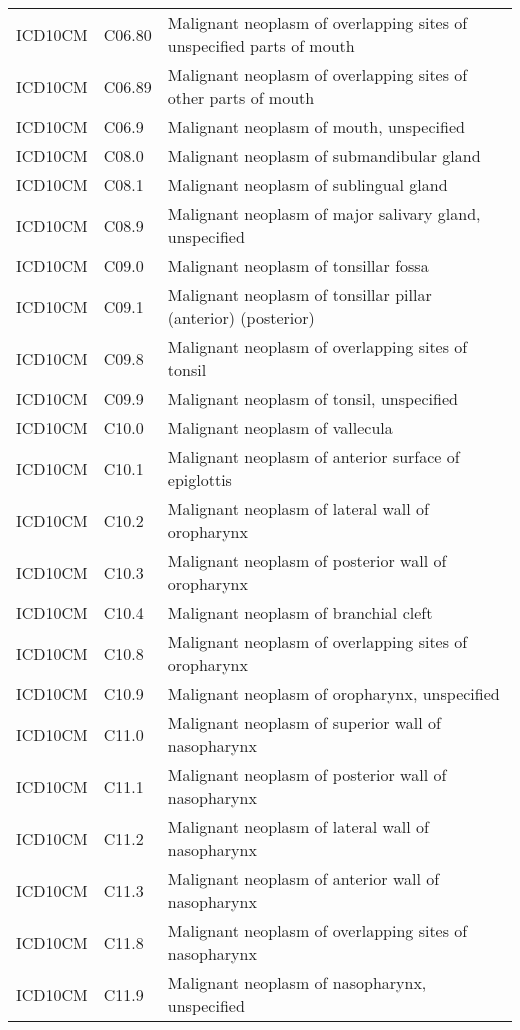 \begin{longtable}{p{}p{}p{}}
  ICD10CM & C06.80 & Malignant neoplasm of overlapping sites of unspecified parts of mouth \\ 
  ICD10CM & C06.89 & Malignant neoplasm of overlapping sites of other parts of mouth \\ 
  ICD10CM & C06.9 & Malignant neoplasm of mouth, unspecified \\ 
  ICD10CM & C08.0 & Malignant neoplasm of submandibular gland \\ 
  ICD10CM & C08.1 & Malignant neoplasm of sublingual gland \\ 
  ICD10CM & C08.9 & Malignant neoplasm of major salivary gland, unspecified \\ 
  ICD10CM & C09.0 & Malignant neoplasm of tonsillar fossa \\ 
  ICD10CM & C09.1 & Malignant neoplasm of tonsillar pillar (anterior) (posterior) \\ 
  ICD10CM & C09.8 & Malignant neoplasm of overlapping sites of tonsil \\ 
  ICD10CM & C09.9 & Malignant neoplasm of tonsil, unspecified \\ 
  ICD10CM & C10.0 & Malignant neoplasm of vallecula \\ 
  ICD10CM & C10.1 & Malignant neoplasm of anterior surface of epiglottis \\ 
  ICD10CM & C10.2 & Malignant neoplasm of lateral wall of oropharynx \\ 
  ICD10CM & C10.3 & Malignant neoplasm of posterior wall of oropharynx \\ 
  ICD10CM & C10.4 & Malignant neoplasm of branchial cleft \\ 
  ICD10CM & C10.8 & Malignant neoplasm of overlapping sites of oropharynx \\ 
  ICD10CM & C10.9 & Malignant neoplasm of oropharynx, unspecified \\ 
  ICD10CM & C11.0 & Malignant neoplasm of superior wall of nasopharynx \\ 
  ICD10CM & C11.1 & Malignant neoplasm of posterior wall of nasopharynx \\ 
  ICD10CM & C11.2 & Malignant neoplasm of lateral wall of nasopharynx \\ 
  ICD10CM & C11.3 & Malignant neoplasm of anterior wall of nasopharynx \\ 
  ICD10CM & C11.8 & Malignant neoplasm of overlapping sites of nasopharynx \\ 
  ICD10CM & C11.9 & Malignant neoplasm of nasopharynx, unspecified \\ 

\end{longtable}
